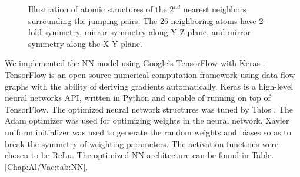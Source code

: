 \begingroup
\begin{figure}[!ht]
  \centering
\caption[Illustration of atomic structures of the $\text{2}^{nd}$ nearest neighbors surrounding the jumping pairs.]{Illustration of atomic structures of the $\text{2}^{nd}$ nearest neighbors surrounding the jumping pairs. The 26 neighboring atoms have 2-fold symmetry, mirror symmetry along Y-Z plane, and mirror symmetry along the X-Y plane.}
\label{Chap:Al/Vac:fig:2nn}
\end{figure}
\endgroup


We implemented the \ac{NN} model using Google's TensorFlow \cite{abadi2016tensorflow} with Keras \cite{chollet2015keras}. TensorFlow is an open source numerical computation framework using data flow graphs with the ability of deriving gradients automatically. Keras is a high-level neural networks API, written in Python and capable of running on top of TensorFlow. The optimized neural network structures was tuned by Talos \cite{Autonomio2019Talos}. The Adam optimizer \cite{kingma2014adam} was used for optimizing weights in the neural network. Xavier uniform initializer \cite{glorot2010understanding} was used to generate the random weights and biases so as to break the symmetry of weighting parameters. The activation functions were chosen to be \acf{ReLu}. The optimized \ac{NN} architecture can be found in Table. \ref{Chap:Al/Vac:tab:NN}.


